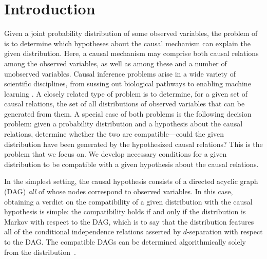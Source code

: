 \section{Introduction}

Given a joint probability distribution of some observed variables, the problem of  is to determine which hypotheses about the causal mechanism can explain the given distribution. Here, a causal mechanism may comprise both causal relations among the observed variables, as well as among these and a number of unobserved variables.
 Causal inference problems arise in a wide variety of scientific disciplines, from sussing out biological pathways to enabling machine learning \cite{pearl2009causality,spirtes2011causation,studeny2005probabilistic,koller2009probabilistic}. A closely related type of problem is to determine, for a given set of causal relations, the set of all distributions of observed variables that can be generated from them.   
A special case of both problems is the following decision problem: given a probability distribution and a hypothesis about the causal relations, determine whether the two are compatible---could the given distribution have been generated by the hypothesized causal relations? This is the problem that we focus on.
We develop necessary conditions for a given distribution to be compatible with a given hypothesis about the causal relations.


In the simplest setting, the causal hypothesis consists of a directed acyclic graph (DAG) {\em all} of whose nodes correspond to observed variables. In this case, obtaining a verdict on the compatibility of a given distribution with the causal hypothesis is simple: the compatibility holds if and only if the distribution is Markov with respect to the DAG, which is to say that the distribution features all of the conditional independence relations asserted by $d$-separation with respect to the DAG. 
The compatible DAGs can be determined algorithmically solely from the distribution~\cite{pearl2009causality}.

